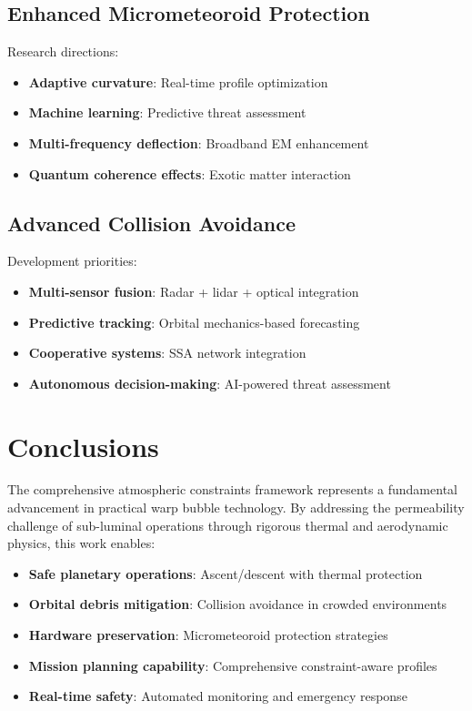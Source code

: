 \documentclass[12pt,a4paper]{article}
\begin{document}
\subsection{Enhanced Micrometeoroid Protection}

Research directions:
\begin{itemize}
\item \textbf{Adaptive curvature}: Real-time profile optimization
\item \textbf{Machine learning}: Predictive threat assessment
\item \textbf{Multi-frequency deflection}: Broadband EM enhancement
\item \textbf{Quantum coherence effects}: Exotic matter interaction
\end{itemize}

\subsection{Advanced Collision Avoidance}

Development priorities:
\begin{itemize}
\item \textbf{Multi-sensor fusion}: Radar + lidar + optical integration
\item \textbf{Predictive tracking}: Orbital mechanics-based forecasting
\item \textbf{Cooperative systems}: SSA network integration
\item \textbf{Autonomous decision-making}: AI-powered threat assessment
\end{itemize}

\section{Conclusions}

The comprehensive atmospheric constraints framework represents a fundamental advancement in practical warp bubble technology. By addressing the permeability challenge of sub-luminal operations through rigorous thermal and aerodynamic physics, this work enables:

\begin{itemize}
\item \textbf{Safe planetary operations}: Ascent/descent with thermal protection
\item \textbf{Orbital debris mitigation}: Collision avoidance in crowded environments  
\item \textbf{Hardware preservation}: Micrometeoroid protection strategies
\item \textbf{Mission planning capability}: Comprehensive constraint-aware profiles
\item \textbf{Real-time safety}: Automated monitoring and emergency response
\end{itemize}
\end{document}
